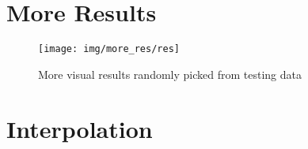 \begin{appendices}
\section{More Results}
\begin{figure*}[htbp]
	\centering
	\texttt{[image: img/more\_res/res]}
	\caption{More visual results randomly picked from testing data}
	\label{fig:more_res}
\end{figure*}

\section{Interpolation}
\end{appendices}